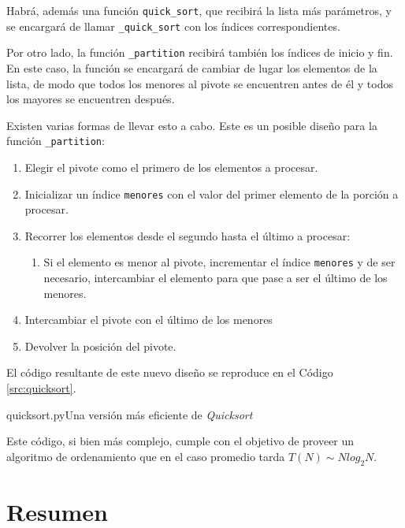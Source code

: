 Habrá, además una función \lstinline!quick_sort!, que recibirá la lista más
parámetros, y se encargará de llamar \lstinline!_quick_sort! con los
índices correspondientes.

Por otro lado, la función \lstinline!_partition! recibirá también los
índices de inicio y fin.  En este caso, la función se encargará de cambiar
de lugar los elementos de la lista, de modo que todos los menores al pivote
se encuentren antes de él y todos los mayores se encuentren después.

Existen varias formas de llevar esto a cabo.  Este es un posible diseño
para la función \lstinline!_partition!:

\begin{enumerate}
\item Elegir el pivote como el primero de los elementos a procesar.
\item Inicializar un índice \lstinline!menores! con el valor del primer
elemento de la porción a procesar.
\item Recorrer los elementos desde el segundo hasta el último a procesar:
\begin{enumerate}
\item Si el elemento es menor al pivote, incrementar el índice
\lstinline!menores! y de ser necesario, intercambiar el elemento para que
pase a ser el último de los menores.
\end{enumerate}
\item Intercambiar el pivote con el último de los menores
\item Devolver la posición del pivote.
\end{enumerate}

El código resultante de este nuevo diseño se reproduce en el Código
\ref{src:quicksort}.

\begin{codigo}{quicksort.py}{Una versión más eficiente de {\it Quicksort}}

\label{src:quicksort}
\end{codigo}

Este código, si bien más complejo, cumple con el objetivo de proveer un
algoritmo de ordenamiento que en el caso promedio tarda 
$T(N) \sim N log_2 N$.

\section{Resumen}

